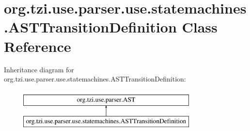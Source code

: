 \hypertarget{classorg_1_1tzi_1_1use_1_1parser_1_1use_1_1statemachines_1_1_a_s_t_transition_definition}{\section{org.\-tzi.\-use.\-parser.\-use.\-statemachines.\-A\-S\-T\-Transition\-Definition Class Reference}
\label{classorg_1_1tzi_1_1use_1_1parser_1_1use_1_1statemachines_1_1_a_s_t_transition_definition}
}
Inheritance diagram for org.\-tzi.\-use.\-parser.\-use.\-statemachines.\-A\-S\-T\-Transition\-Definition\-:\begin{figure}[H]
\begin{center}
\leavevmode
\includegraphics[height=2.000000cm]{classorg_1_1tzi_1_1use_1_1parser_1_1use_1_1statemachines_1_1_a_s_t_transition_definition}
\end{center}
\end{figure}
